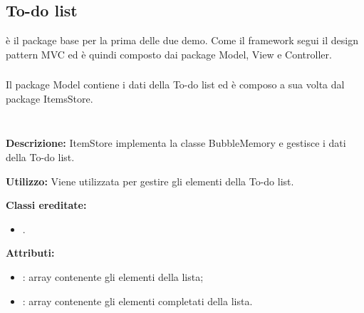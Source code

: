 \subsection{To-do list} \label{To-do list}
 è il package base per la prima delle due demo. Come il framework segui il design pattern MVC ed è quindi composto dai package Model, View e Controller.

\subsubsection[::Model]{\class} \label{\class}
Il package Model contiene i dati della To-do list ed è composo a sua volta dal package ItemsStore.

\subparagraph[::ItemStore]{\class}\mbox{}\\ \label{\class}
\textbf{Descrizione:}
ItemStore implementa la classe BubbleMemory e gestisce i dati della To-do list.

\textbf{Utilizzo:}
Viene utilizzata per gestire gli elementi della To-do list.

\textbf{Classi ereditate:}
\begin{itemize}
	\item {}.
\end{itemize}

\textbf{Attributi:}
\begin{itemize}
	\item {}: array contenente gli elementi della lista;
	\item {}: array contenente gli elementi completati della lista.
\end{itemize}

